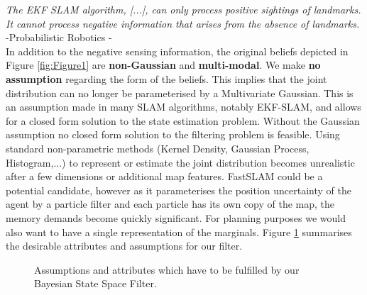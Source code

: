 {\quote \textit{The EKF SLAM algorithm, [...], can only process positive sightings of landmarks. It cannot process negative information
that arises from the absence of landmarks. } -Probabilistic Robotics \cite[p.313]{Thrun_Burgard_Fox_2005}-}\\[0.01cm]

In addition to the negative sensing information, the original beliefs depicted in Figure \ref{fig:Figure1} are \textbf{non-Gaussian}
and \textbf{multi-modal}. We make \textbf{no assumption} regarding the form of the beliefs. This implies that the joint distribution 
can no longer be parameterised by a Multivariate Gaussian. 
This is an assumption made in many SLAM algorithms, notably EKF-SLAM, and allows for a closed form solution to the state estimation problem. Without the Gaussian assumption 
no closed form solution to the filtering problem is feasible. 
Using standard non-parametric methods (Kernel Density, Gaussian Process, Histogram,...) to represent or estimate the joint distribution becomes
unrealistic after a few dimensions or additional map features. 
FastSLAM could be a potential candidate, however as it parameterises the position uncertainty of the agent by a particle filter and each
particle has its own copy of the map, the memory demands become quickly significant.  For planning purposes we would also want to have a 
single representation of the marginals. Figure \ref{fig:ch5_assmuptions} summarises the desirable attributes and assumptions for our filter.

\begin{figure}
\centering
{}%
\caption{Assumptions and attributes which have to be fulfilled by our Bayesian State Space Filter. }
 \label{fig:ch5_assmuptions}
\end{figure}

